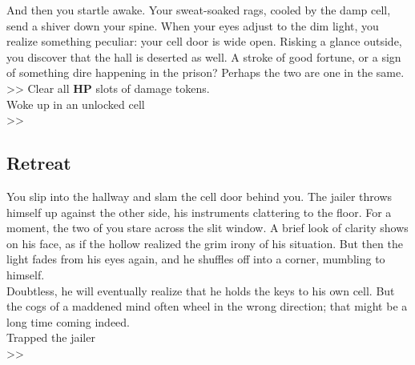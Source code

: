 And then you startle awake. Your sweat-soaked rags, cooled by the damp cell, send a shiver down your spine. When your eyes adjust to the dim light, you realize something peculiar: your cell door is wide open. Risking a glance outside, you discover that the hall is deserted as well. A stroke of good fortune, or a sign of something dire happening in the prison? Perhaps the two are one in the same.\\

>> Clear all \textbf{HP} slots of damage tokens.\\
 Woke up in an unlocked cell\\
>> 

\subsection*{Retreat}
You slip into the hallway and slam the cell door behind you. The jailer throws himself up against the other side, his instruments clattering to the floor. For a moment, the two of you stare across the slit window. A brief look of clarity shows on his face, as if the hollow realized the grim irony of his situation. But then the light fades from his eyes again, and he shuffles off into a corner, mumbling to himself.\\

Doubtless, he will eventually realize that he holds the keys to his own cell. But the cogs of a maddened mind often wheel in the wrong direction; that might be a long time coming indeed.\\

 Trapped the jailer\\
>> 